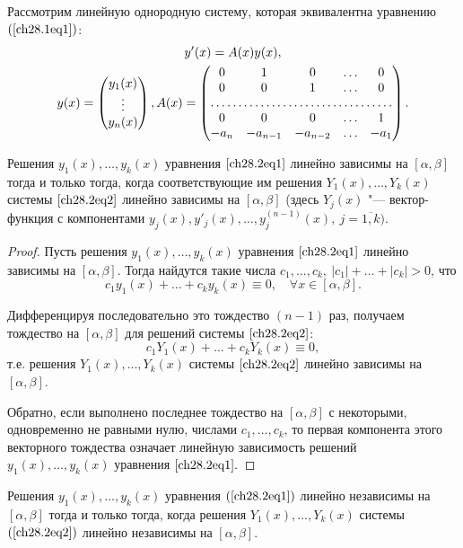 Рассмотрим линейную однородную систему, которая эквивалентна уравнению $(\ref{ch28.1eq1})$:
\begin{multline} \label{ch28.2eq2}
y'(x) = A(x)y(x), \\
y(x) = \begin{pmatrix}
y_1(x) \\
\vdots \\
y_n(x)
\end{pmatrix},
A(x) = \begin{pmatrix}
0 & 1 & 0 & \ldots & 0 \\
0 & 0 & 1 & \ldots & 0 \\
\hdotsfor{5} \\
0 & 0 & 0 & \ldots & 1 \\
-a_n & -a_{n - 1} & -a_{n - 2} & \ldots & -a_1
\end{pmatrix}.
\end{multline}

\begin{lemm} \label{ch28.2lemm1}
Решения $y_1(x), \ldots, y_k(x)$ уравнения $\eqref{ch28.2eq1}$ линейно зависимы на $[\alpha, \beta]$ тогда и только тогда, когда соответствующие им решения $Y_1(x), \ldots, Y_k(x)$ системы $\eqref{ch28.2eq2}$ линейно зависимы на $[\alpha,\beta]$ (здесь $Y_j(x)$ "--- вектор-функция с компонентами $y_j(x), y'_j(x), \ldots, y^{(n - 1)}_j(x), \: j = \overline{1,k})$.
\end{lemm}

\begin{proof}
Пусть решения $y_1(x), \ldots, y_k(x)$ уравнения $\eqref{ch28.2eq1}$ линейно зависимы на $[\alpha, \beta]$. Тогда найдутся такие числа $c_1, \ldots, c_k, \: |c_1| + \ldots + |c_k| > 0$, что 
$$
c_1y_1(x) + \ldots + c_ky_k(x) \equiv 0, \quad \forall x \in [\alpha, \beta].
$$

Дифференцируя последовательно это тождество $(n - 1)$ раз, получаем тождество на $[\alpha, \beta]$ для решений системы $\eqref{ch28.2eq2}$:
$$
c_1Y_1(x) + \ldots + c_kY_k(x) \equiv 0,
$$
т.е. решения $Y_1(x), \ldots, Y_k(x)$ системы $\eqref{ch28.2eq2}$ линейно зависимы на $[\alpha, \beta]$.

Обратно, если выполнено последнее тождество на $[\alpha, \beta]$ с некоторыми, одновременно не равными нулю, числами $c_1, \ldots, c_k$, то первая компонента этого векторного тождества означает линейную зависимость решений $y_1(x), \ldots, y_k(x)$ уравнения $\eqref{ch28.2eq1}.$
\end{proof}

\begin{cons}
Решения $y_1(x), \ldots, y_k(x)$ уравнения $(\ref{ch28.2eq1})$ линейно независимы на $[\alpha, \beta]$ тогда и только тогда, когда решения $Y_1(x), \ldots, Y_k(x)$ системы $(\ref{ch28.2eq2})$ линейно независимы на $[\alpha, \beta]$.
\end{cons}

